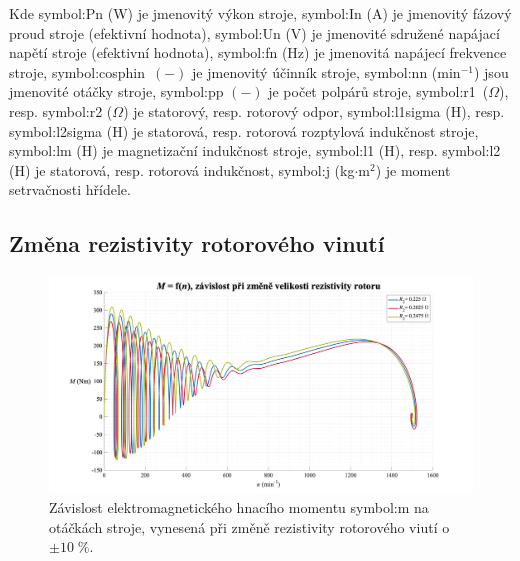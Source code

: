 \documentclass[a4paper, twoside, 11pt]{article}
\newcommand{\fbar}{\FloatBarrier}
\begin{document}
        \vspace*{1cm}
Kde \gls{symbol:Pn} (W) je jmenovitý výkon stroje, \gls{symbol:In} (A) je jmenovitý fázový proud stroje (efektivní hodnota), \gls{symbol:Un} (V) je jmenovité sdružené napájací napětí stroje (efektivní hodnota), \gls{symbol:fn} (Hz) je jmenovitá napájecí frekvence stroje, \gls{symbol:cosphin}~$(-)$ je jmenovitý účinník stroje, \gls{symbol:nn} (min$^{-1}$) jsou jmenovité otáčky stroje, \gls{symbol:pp} $(-)$ je počet polpárů stroje, \gls{symbol:r1}~($\Omega$), resp. \gls{symbol:r2} ($\Omega$) je statorový, resp. rotorový odpor, \gls{symbol:l1sigma} (H), resp. \gls{symbol:l2sigma} (H) je statorová, resp. rotorová rozptylová  indukčnost stroje, \gls{symbol:lm} (H) je magnetizační indukčnost stroje, \gls{symbol:l1} (H), resp. \gls{symbol:l2} (H) je statorová, resp. rotorová indukčnost, \gls{symbol:j} (kg$\cdot$m$^{2}$) je moment setrvačnosti hřídele.\par

\newpage
    \subsection{Změna rezistivity rotorového vinutí}
        \begin{figure}[htbp!]
            \centering
            \includegraphics[width=1\textwidth]{src/png/mh_dyn_nGraphR2.png}
            \caption{Závislost elektromagnetického hnacího momentu \gls{symbol:m} na otáčkách stroje, vynesená při změně rezistivity rotorového viutí o~$\pm 10\;\%$.}
            \label{fig:mh_dyn_nGraphR2}
        \end{figure}

    \fbar
\end{document}
